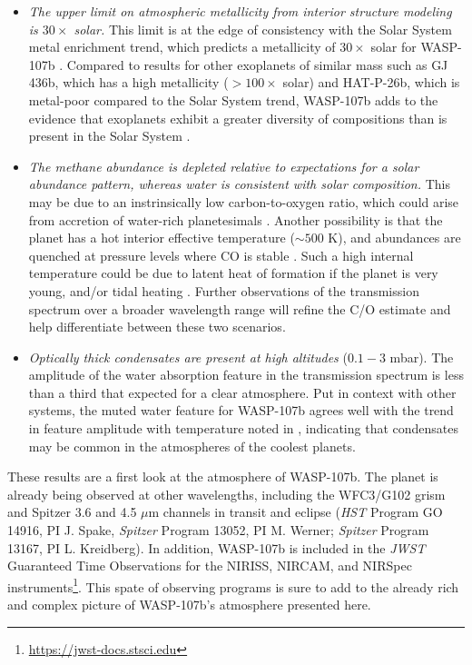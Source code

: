 \documentclass[twocolumn, trackchanges]{aastex61}
\begin{document}
\begin{itemize}
\item{\emph{The upper limit on atmospheric metallicity from interior structure modeling is $30\times$ solar.} This limit is at the edge of consistency with the Solar System metal enrichment trend, which predicts a metallicity of $30\times$ solar for WASP-107b \citep{kreidberg14b}.  Compared to results for other exoplanets of similar mass such as GJ 436b, which has a high metallicity ($>100\times$ solar) and HAT-P-26b, which is metal-poor compared to the Solar System trend, WASP-107b adds to the evidence that exoplanets exhibit a greater diversity of compositions than is present in the Solar System \citep{morley17, wakeford17}.}
\item{\emph{The methane abundance is  depleted relative to expectations for a solar abundance pattern, whereas water is consistent with solar composition.} This may be due to an instrinsically low carbon-to-oxygen ratio, which could arise from accretion of water-rich planetesimals \citep{mordasini16, espinoza17}.  Another possibility is that the planet has a hot interior effective temperature ($\sim500$ K), and abundances are quenched at pressure levels where CO is stable \citep[as observed in some directly imaged planets;][]{skemer14, zahnle14}. Such a high internal temperature could be due to latent heat of formation if the planet is very young, and/or tidal heating \citep{fortney08, morley17}. Further observations of the transmission spectrum over a broader wavelength range will refine the C/O estimate and help differentiate between these two scenarios.} 
\item{\emph{Optically thick condensates are present at high altitudes} ($0.1 - 3$ mbar). The amplitude of the water absorption feature in the transmission spectrum is less than a third that expected for a clear atmosphere.   Put in context with other systems, the muted water feature for WASP-107b agrees well with the trend in feature amplitude with temperature noted in \cite{crossfield17}, indicating that condensates may be common in the atmospheres of the coolest planets.}
\end{itemize}

These results are a first look at the atmosphere of WASP-107b. The planet is already being observed at other wavelengths, including the WFC3/G102 grism and Spitzer 3.6 and 4.5 $\mu$m channels in transit and eclipse (\emph{HST} Program GO 14916, PI J. Spake, \emph{Spitzer} Program 13052, PI M. Werner; \emph{Spitzer} Program 13167, PI L. Kreidberg).  In addition, WASP-107b is included in the \emph{JWST} Guaranteed Time Observations for the NIRISS, NIRCAM, and NIRSpec instruments\footnote{\url{https://jwst-docs.stsci.edu}}.  This spate of observing programs is sure to add to the already rich and complex picture of WASP-107b's atmosphere presented here. 
\end{document}
